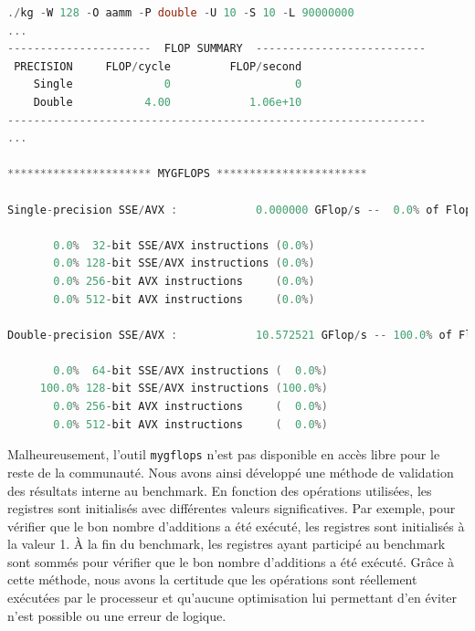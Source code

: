 \begin{minipage}{0.97\linewidth}         \begin{lstlisting}[label=lst:basic_gflops ,language=C, caption={L'utilisation de l'outil \texttt{mygflops}, développé par notre équipe, a permis de valider les résultats donnés par notre benchmark (\textit{ligne 6}). L'outil \texttt{mygflops} utilise les compteurs matériels pour mesurer les différentes instructions de calculs réalisées et permet de valider nos résultats (\textit{ligne 19}).}]
./kg -W 128 -O aamm -P double -U 10 -S 10 -L 90000000
...
----------------------  FLOP SUMMARY  --------------------------
 PRECISION     FLOP/cycle         FLOP/second
    Single              0                   0
    Double           4.00            1.06e+10
----------------------------------------------------------------
...

********************** MYGFLOPS ***********************
     
Single-precision SSE/AVX :            0.000000 GFlop/s --  0.0% of Flops

       0.0%  32-bit SSE/AVX instructions (0.0%)
       0.0% 128-bit SSE/AVX instructions (0.0%)
       0.0% 256-bit AVX instructions     (0.0%)
       0.0% 512-bit AVX instructions     (0.0%)
     
Double-precision SSE/AVX :            10.572521 GFlop/s -- 100.0% of Flops

       0.0%  64-bit SSE/AVX instructions (  0.0%)
     100.0% 128-bit SSE/AVX instructions (100.0%)
       0.0% 256-bit AVX instructions     (  0.0%)
       0.0% 512-bit AVX instructions     (  0.0%)

\end{lstlisting} \end{minipage}
        
        Malheureusement, l'outil \verb=mygflops= n'est pas disponible en accès libre pour le reste de la communauté. Nous avons ainsi développé une méthode de validation des résultats interne au benchmark. En fonction des opérations utilisées, les registres sont initialisés avec différentes valeurs significatives. Par exemple, pour vérifier que le bon nombre d'additions a été exécuté, les registres sont initialisés à la valeur 1. À la fin du benchmark, les registres ayant participé au benchmark sont sommés pour vérifier que le bon nombre d'additions a été exécuté. Grâce à cette méthode, nous avons la certitude que les opérations sont réellement exécutées par le processeur et qu'aucune optimisation lui permettant d'en éviter n'est possible ou une erreur de logique.
        

